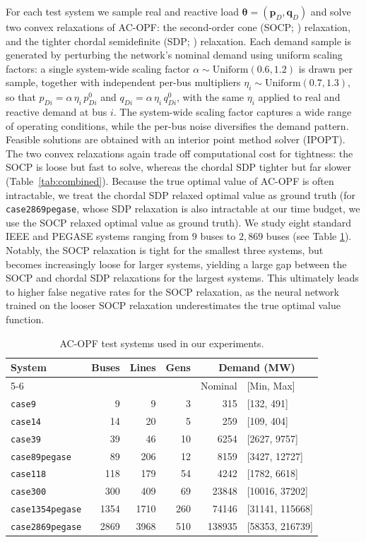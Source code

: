 \documentclass[10pt]{article} %
\theoremstyle{plain}
\theoremstyle{definition}
\theoremstyle{remark}
\begin{document}
For each test system we sample real and reactive load $\bm{\theta} = (\mathbf{p}_D, \mathbf{q}_D)$ and solve two convex relaxations of AC-OPF: the second-order cone (SOCP; \citealp{jabr2006radial}) relaxation, and the tighter chordal semidefinite (SDP; \citealp{lavaei2012zero}) relaxation.
Each demand sample is generated by perturbing the network's nominal demand using uniform scaling factors: a single system-wide scaling factor $\alpha \sim \mathrm{Uniform}(0.6, 1.2)$ is drawn per sample, together with independent per-bus multipliers $\eta_i \sim \mathrm{Uniform}(0.7, 1.3)$, so that $p_{Di} = \alpha\,\eta_i\,p_{Di}^{0}$ and $q_{Di} = \alpha\,\eta_i\,q_{Di}^{0}$, with the same $\eta_i$ applied to real and reactive demand at bus $i$. 
The system-wide scaling factor captures a wide range of operating conditions, while the per-bus noise diversifies the demand pattern.
Feasible solutions are obtained with an interior point method solver (IPOPT).
The two convex relaxations again trade off computational cost for tightness: the SOCP is loose but fast to solve, whereas the chordal SDP tighter but far slower (Table~\ref{tab:combined}).
Because the true optimal value of AC-OPF is often intractable, we treat the chordal SDP relaxed optimal value as ground truth (for \texttt{case2869pegase}, whose SDP relaxation is also intractable at our time budget, we use the SOCP relaxed optimal value as ground truth). We study eight standard IEEE and PEGASE systems ranging from $9$ buses to $2{,}869$ buses (see Table \ref{tab:acopf-cases}).
Notably, the SOCP relaxation is tight for the smallest three systems, but becomes increasingly loose for larger systems, yielding a large gap between the SOCP and chordal SDP relaxations for the largest systems. This ultimately leads to higher false negative rates for the SOCP relaxation, as the neural network trained on the looser SOCP relaxation underestimates the true optimal value function.

\begin{table}[t]
\centering
\caption{AC-OPF test systems used in our experiments.}
\label{tab:acopf-cases}
\begin{tabular}{l rrr rl}
\toprule
System & Buses & Lines & Gens & \multicolumn{2}{c}{Demand (MW)} \\
\cmidrule(lr){5-6}
 & & & & Nominal & [Min, Max] \\
\midrule
\texttt{case9} & 9 & 9 & 3 & 315 & [132, 491] \\
\texttt{case14} & 14 & 20 & 5 & 259 & [109, 404] \\
\texttt{case39} & 39 & 46 & 10 & 6254 & [2627, 9757] \\
\texttt{case89pegase} & 89 & 206 & 12 & 8159 & [3427, 12727] \\
\texttt{case118} & 118 & 179 & 54 & 4242 & [1782, 6618] \\
\texttt{case300} & 300 & 409 & 69 & 23848 & [10016, 37202] \\
\texttt{case1354pegase} & 1354 & 1710 & 260 & 74146 & [31141, 115668] \\
\texttt{case2869pegase} & 2869 & 3968 & 510 & 138935 & [58353, 216739] \\
\bottomrule
\end{tabular}
\end{table}
\end{document}
